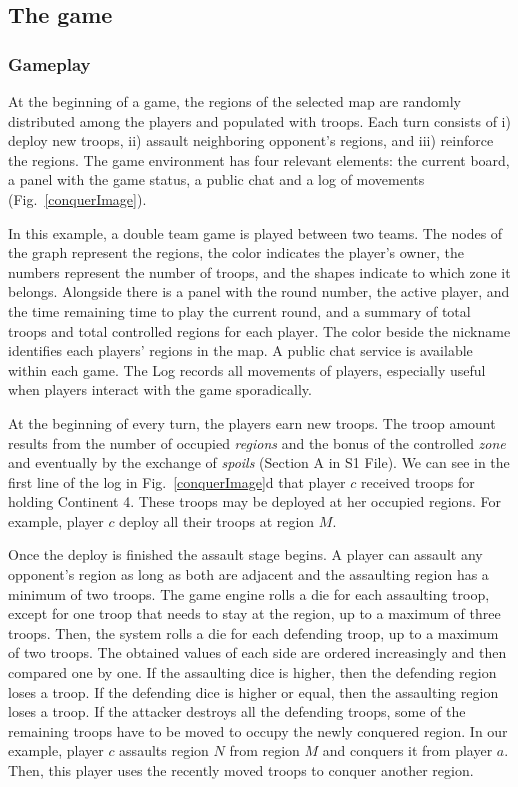 \documentclass[a4paper,10pt]{book}
\theoremstyle{definition}
\begin{document}
\subsection{The game}

\subsubsection*{Gameplay}\label{sub:gameplay}

At the beginning of a game, the regions of the selected map are randomly distributed among the players and populated with troops.
Each turn consists of i) deploy new troops, ii) assault neighboring opponent's regions, and iii) reinforce the regions.
The game environment has four relevant elements: the current board, a panel with the game status, a public chat and a log of movements (Fig.~\ref{conquerImage}).

In this example, a double team game is played between two teams.
The nodes of the graph represent the regions, the color indicates the player's owner, the numbers represent the number of troops, and the shapes indicate to which zone it belongs.
Alongside there is a panel with the round number, the active player, and the time remaining time to play the current round, and a summary of total troops and total controlled regions for each player.
The color beside the nickname identifies each players' regions in the map.
A public chat service is available within each game.
The Log records all movements of players, especially useful when players interact with the game sporadically.

At the beginning of every turn, the players earn new troops. 
The troop amount results from the number of occupied \emph{regions} and the bonus of the controlled \emph{zone} and eventually by the exchange of \emph{spoils} (Section A in S1 File).
We can see in the first line of the log in Fig.~\ref{conquerImage}d that player $c$ received troops for holding Continent 4.
These troops may be deployed at her occupied regions.
For example, player $c$ deploy all their troops at region $M$.

Once the deploy is finished the assault stage begins.
A player can assault any opponent's region as long as both are adjacent and the assaulting region has a minimum of two troops.
The game engine rolls a die for each assaulting troop, except for one troop that needs to stay at the region, up to a maximum of three troops.
Then, the system rolls a die for each defending troop, up to a maximum of two troops.
The obtained values of each side are ordered increasingly and then compared one by one.
If the assaulting dice is higher, then the defending region loses a troop.
If the defending dice is higher or equal, then the assaulting region loses a troop.
If the attacker destroys all the defending troops, some of the remaining troops have to be moved to occupy the newly conquered region.
In our example, player $c$ assaults region $N$ from region $M$ and conquers it from player $a$.
Then, this player uses the recently moved troops to conquer another region.
\end{document}
